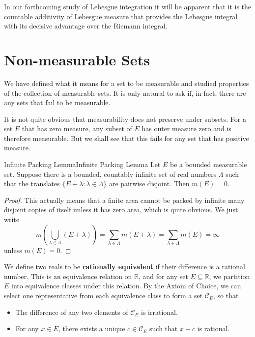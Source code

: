 \documentclass[../main.tex]{subfiles}
\begin{document}
\begin{remark}
  In our forthcoming study of Lebesgue integration it will be apparent that it is the countable additivity of Lebesgue measure that provides the Lebesgue integral with its decisive advantage over the Riemann integral.
\end{remark}

\section{Non-measurable Sets}
We have defined what it means for a set to be measurable and studied properties of the collection of measurable sets. It is only natural to ask if, in fact, there are any sets that fail to be measurable.

It is not quite obvious that measurability does not preserve under subsets. For a set $E$ that has zero measure, any subset of $E$ has outer measure zero and is therefore measurable. But we shall see that this fails for any set that has positive measure.

\begin{lemma}{Infinite Packing Lemma}{Infinite Packing Lemma}
  Let $E$ be a bounded measurable set. Suppose there is a bounded, countably infinite set of real numbers $\Lambda$ such that the translates $\{E + \lambda : \lambda \in \Lambda\}$ are pairwise disjoint. Then $m(E) = 0$.
\end{lemma}
\begin{proof}
  This actually means that a finite area cannot be packed by infinite many disjoint copies of itself unless it has zero area, which is quite obvious. We just write
  \begin{equation*}
    m\left(\bigcup_{\lambda \in \Lambda} (E + \lambda)\right) = \sum_{\lambda \in \Lambda} m(E + \lambda) = \sum_{\lambda \in \Lambda} m(E) = \infty
  \end{equation*}
  unless $m(E) = 0$.
\end{proof}

We define two reals to be \textbf{rationally equivalent} if their difference is a rational number. This is an equivalence relation on $\mathbb{R}$, and for any set $E \subseteq \mathbb{R}$, we partition $E$ into equivalence classes under this relation. By the Axiom of Choice, we can select one representative from each equivalence class to form a set $\mathcal{C}_E$, so that
\begin{itemize}
  \item The difference of any two elements of $\mathcal{C}_E$ is irrational.
  \item For any $x \in E$, there exists a unique $c \in \mathcal{C}_E$ such that $x - c$ is rational.
\end{itemize}
\end{document}
